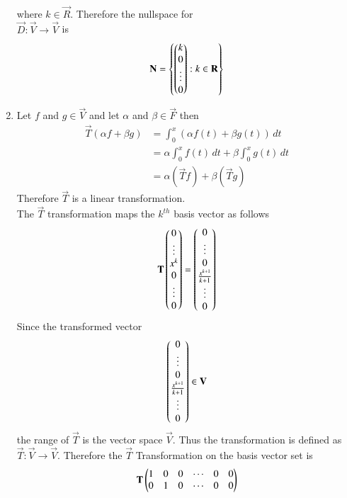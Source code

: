 \documentclass[journal,12pt,twocolumn]{IEEEtran}
\begin{document}
\begin{enumerate}[label=\emph{\alph*)}]
\begin{align}
\end{align}
where $k \in \vec{R}$. Therefore the nullspace for \\$\vec{D}:\vec{V}\rightarrow\vec{V}$ is
\begin{align}
	\mathbf{N}=\left\{\begin{pmatrix}k\\0\\\vdots\\0\end{pmatrix}:k \in \mathbf{R}\right\}
\end{align}
\item
Let $f$ and $g \in \vec{V}$ and let $\alpha$ and $\beta \in \vec{F}$ then
\begin{align}
	\vec{T}(\alpha f + \beta g)&=\int_{0}^{x}(\alpha f(t) + \beta g(t))\,dt\\
	&=\alpha\int_{0}^{x} f(t)\,dt+\beta\int_{0}^{x} g(t)\,dt\\
     &=\alpha(\vec{T}f)+\beta(\vec{T}g)
\end{align}
Therefore $\vec{T}$ is a linear transformation.\\
The $\vec{T}$ transformation maps the $k^{th}$ basis vector as follows
\begin{align}
      \mathbf{T}\begin{pmatrix}0\\ \vdots \\ x^k \\0 \\ \vdots \\0\end{pmatrix}
      =\begin{pmatrix}0\\ \vdots \\ 0\\ \frac{x^{k+1}}{k+1} \\ \vdots \\0\end{pmatrix}
\end{align}
Since the transformed vector
\begin{align}
	\begin{pmatrix}0\\ \vdots \\ 0\\ \frac{x^{k+1}}{k+1} \\ \vdots \\0\end{pmatrix} \in \mathbf{V}
\end{align}
the range of $\vec{T}$ is the vector space $\vec{V}$. Thus the transformation is defined as 
$\vec{T} : \vec{V}\rightarrow \vec{V}$.
Therefore the $\vec{T}$ Transformation on the basis vector set is
                \begin{align}
                        \mathbf{T}\begin{pmatrix}1 & 0 & 0 & \cdots & 0 & 0\\
                                      0 & 1 & 0 & \cdots & 0 & 0 \\
\end{pmatrix}
\end{align}
\end{enumerate}
\end{document}
